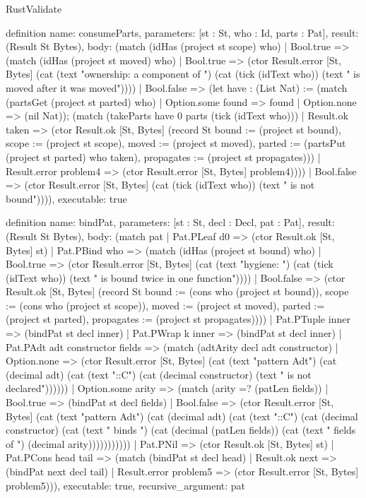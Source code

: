 \begin{lexlean}{RustValidate}
\begin{semanticmodule}
definition{
  name: consumeParts,
  parameters: [st : St, who : Id, parts : Pat],
  result: (Result St Bytes),
  body: (match (idHas (project st scope) who)
    | Bool.true => (match (idHas (project st moved) who)
      | Bool.true => (ctor Result.error [St, Bytes] (cat (text "ownership: a component of ") (cat (tick (idText who)) (text " is moved after it was moved"))))
      | Bool.false => (let have : (List Nat) := (match (partsGet (project st parted) who)
        | Option.some found => found
        | Option.none => (nil Nat)); (match (takeParts have 0 parts (tick (idText who)))
        | Result.ok taken => (ctor Result.ok [St, Bytes] (record St {bound := (project st bound), scope := (project st scope), moved := (project st moved), parted := (partsPut (project st parted) who taken), propagates := (project st propagates)}))
        | Result.error problem4 => (ctor Result.error [St, Bytes] problem4))))
    | Bool.false => (ctor Result.error [St, Bytes] (cat (tick (idText who)) (text " is not bound")))),
  executable: true
}

definition{
  name: bindPat,
  parameters: [st : St, decl : Decl, pat : Pat],
  result: (Result St Bytes),
  body: (match pat
    | Pat.PLeaf d0 => (ctor Result.ok [St, Bytes] st)
    | Pat.PBind who => (match (idHas (project st bound) who)
      | Bool.true => (ctor Result.error [St, Bytes] (cat (text "hygiene: ") (cat (tick (idText who)) (text " is bound twice in one function"))))
      | Bool.false => (ctor Result.ok [St, Bytes] (record St {bound := (cons who (project st bound)), scope := (cons who (project st scope)), moved := (project st moved), parted := (project st parted), propagates := (project st propagates)})))
    | Pat.PTuple inner => (bindPat st decl inner)
    | Pat.PWrap k inner => (bindPat st decl inner)
    | Pat.PAdt adt constructor fields => (match (adtArity decl adt constructor)
      | Option.none => (ctor Result.error [St, Bytes] (cat (text "pattern Adt") (cat (decimal adt) (cat (text "::C") (cat (decimal constructor) (text " is not declared"))))))
      | Option.some arity => (match (arity =? (patLen fields))
        | Bool.true => (bindPat st decl fields)
        | Bool.false => (ctor Result.error [St, Bytes] (cat (text "pattern Adt") (cat (decimal adt) (cat (text "::C") (cat (decimal constructor) (cat (text " binds ") (cat (decimal (patLen fields)) (cat (text " fields of ") (decimal arity)))))))))))
    | Pat.PNil => (ctor Result.ok [St, Bytes] st)
    | Pat.PCons head tail => (match (bindPat st decl head)
      | Result.ok next => (bindPat next decl tail)
      | Result.error problem5 => (ctor Result.error [St, Bytes] problem5))),
  executable: true,
  recursive_argument: pat
}


\end{semanticmodule}
\end{lexlean}
